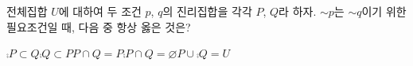 전체집합 $U$에 대하여 두 조건 $p$, $q$의 진리집합을 각각 $P$, $Q$라 하자. $\sim p$는 $\sim q$이기 위한 필요조건일 때, 다음 중 항상 옳은 것은?
\begin{choices32}{$\comp{P}\subset Q$}{$\comp{Q}\subset P$}{$P\cap Q=P$}{$\comp{P}\cap Q=\varnothing$}{$P\cup\comp{Q}=U$}\end{choices32}
